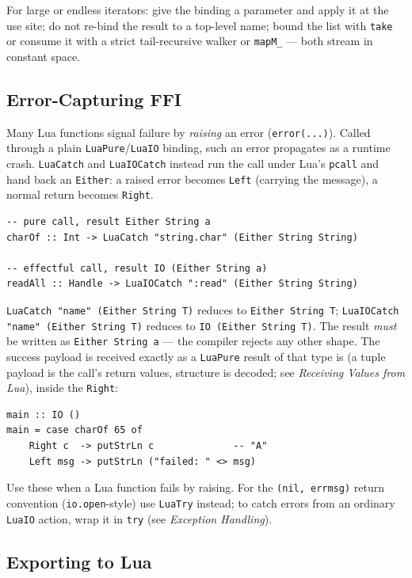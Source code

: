 \documentclass[11pt,a4paper]{article}
\begin{document}
For large or endless iterators: give the binding a parameter and
apply it at the use site; do not re-bind the result to a top-level
name; bound the list with \texttt{take} or consume it with a strict
tail-recursive walker or \texttt{mapM\_} --- both stream in constant
space.

\subsection{Error-Capturing FFI}

Many Lua functions signal failure by \emph{raising} an error
(\texttt{error(...)}).  Called through a plain \texttt{LuaPure}/\texttt{LuaIO}
binding, such an error propagates as a runtime crash.  \texttt{LuaCatch} and
\texttt{LuaIOCatch} instead run the call under Lua's \texttt{pcall} and hand
back an \texttt{Either}: a raised error becomes \texttt{Left} (carrying the
message), a normal return becomes \texttt{Right}.

\begin{lstlisting}
-- pure call, result Either String a
charOf :: Int -> LuaCatch "string.char" (Either String String)

-- effectful call, result IO (Either String a)
readAll :: Handle -> LuaIOCatch ":read" (Either String String)
\end{lstlisting}

\texttt{LuaCatch "name" (Either String T)} reduces to \texttt{Either String T};
\texttt{LuaIOCatch "name" (Either String T)} reduces to
\texttt{IO (Either String T)}.  The result \emph{must} be written as
\texttt{Either String a} --- the compiler rejects any other shape.  The
success payload is received exactly as a \texttt{LuaPure} result of
that type is (a tuple payload is the call's return values, structure is
decoded; see \emph{Receiving Values from Lua}), inside the
\texttt{Right}:

\begin{lstlisting}
main :: IO ()
main = case charOf 65 of
    Right c  -> putStrLn c              -- "A"
    Left msg -> putStrLn ("failed: " <> msg)
\end{lstlisting}

Use these when a Lua function fails by raising.  For the
\texttt{(nil, errmsg)} return convention (\texttt{io.open}-style) use
\texttt{LuaTry} instead; to catch errors from an ordinary \texttt{LuaIO}
action, wrap it in \texttt{try} (see \emph{Exception Handling}).

\subsection{Exporting to Lua}
\end{document}
